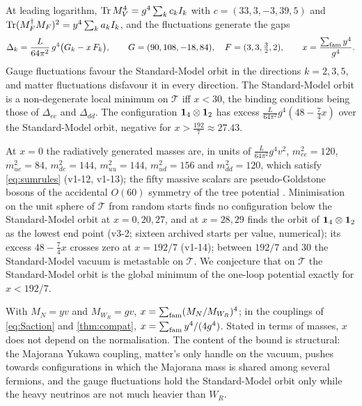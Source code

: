 \begin{theorem}
\label{thm:oneloop1013}
At leading logarithm, $\operatorname{Tr} M_V^4=g^4\sum_kc_kI_k$ with $c=(33,3,-3,39,5)$ and $\operatorname{Tr}(M_F^\dagger M_F)^2=y^4\sum_ka_kI_k$, and the fluctuations generate the gaps
\[
\Delta_k=\frac L{64\pi^2}\,g^4\bigl(G_k-x\,F_k\bigr),\qquad G=(90,108,-18,84),\quad F=(3,3,\tfrac32,2),\qquad x=\frac{\sum_{\rm fam}y^4}{g^4}.
\]
Gauge fluctuations favour the Standard-Model orbit in the directions $k=2,3,5$, and matter fluctuations disfavour it in every direction. The Standard-Model
orbit is a non-degenerate local minimum on $\mathcal T$ iff $x<30$, the binding conditions being those of $\Delta_{ee}$ and $\Delta_{dd}$. The configuration $\mathbf 1_4\otimes\mathbf 1_2$
has excess $\tfrac L{64\pi^2}g^4(48-\tfrac74x)$ over the Standard-Model orbit, negative for $x>\tfrac{192}7\approx27.43$.
\end{theorem}

At $x=0$ the radiatively generated masses are, in units of $\tfrac L{64\pi^2}g^4v^2$, $m_{ee}^2=120$, $m_{ue}^2=84$, $m_{de}^2=144$, $m_{uu}^2=144$, $m_{ud}^2=156$ and
$m_{dd}^2=120$, which satisfy \eqref{eq:sumrules} (v1-12, v1-13); the fifty massive scalars are pseudo-Goldstone bosons of the accidental $O(60)$ symmetry of the tree potential
\cite{Weinberg72,GildenerWeinberg76}. Minimisation on the unit sphere of $\mathcal T$ from random starts finds no configuration below the Standard-Model
orbit at $x=0,20,27$, and at $x=28,29$ finds the orbit of $\mathbf 1_4\otimes\mathbf 1_2$ as the lowest end point (v3-2; sixteen archived starts per value, numerical); its excess
$48-\tfrac74x$ crosses zero at $x=192/7$ (v1-14); between $192/7$ and $30$ the Standard-Model vacuum is metastable on $\mathcal T$. We conjecture that on $\mathcal T$ the Standard-Model orbit is the global minimum of the one-loop potential exactly
for $x<192/7$.

With $M_N=yv$ and $M_{W_R}=gv$, $x=\sum_{\rm fam}(M_N/M_{W_R})^4$; in the couplings of \eqref{eq:Saction} and \cref{thm:compat},
$x=\sum_{\rm fam}y^4/(4g^4)$. Stated in terms of masses, $x$ does not depend on the normalisation. The content of the bound is structural: the Majorana Yukawa coupling, matter's only handle on the
vacuum, pushes towards configurations in which the Majorana mass is shared among several fermions, and the gauge fluctuations hold the Standard-Model orbit only
while the heavy neutrinos are not much heavier than $W_R$.

